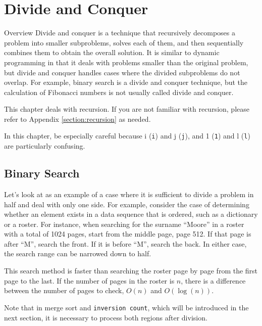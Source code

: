 \chapter{Divide and Conquer}\label{chapter:divide-and-conquer}

\begin{itembox}[l]{Overview}
Divide and conquer is a technique that recursively decomposes a problem into smaller subproblems, solves each of them, and then sequentially combines them to obtain the overall solution.
It is similar to dynamic programming in that it deals with problems smaller than the original problem, but divide and conquer handles cases where the divided subproblems do not overlap. For example, binary search is a divide and conquer technique, but the calculation of Fibonacci numbers is not usually called divide and conquer.

This chapter deals with recursion. If you are not familiar with recursion, please refer to Appendix \ref{section:recursion} as needed.
\end{itembox}

In this chapter, be especially careful because i (\texttt{i}) and j (\texttt{j}), and 1 (\texttt{1}) and l (\texttt{l}) are particularly confusing.
\section{Binary Search}\label{section:binary-search}

Let's look at  as an example of a case where it is sufficient to divide a problem in half and deal with only one side.
For example, consider the case of determining whether an element exists in a data sequence that is ordered, such as a dictionary or a roster.
For instance, when searching for the surname ``Moore'' in a roster with a total of 1024 pages,
start from the middle page, page 512. If that page is after ``M'', search the front. If it is before ``M'', search the back. In either case, the search range can be narrowed down to half.

This search method is faster than searching the roster page by page from the first page to the last.
If the number of pages in the roster is $n$, there is a difference between the number of pages to check, $O(n)$ and $O(\log(n))$.

Note that in merge sort and \texttt{inversion count}, which will be introduced in the next section, it is necessary to process both regions after division.

